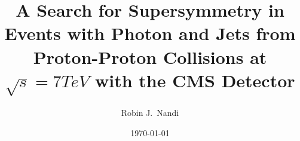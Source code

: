\documentclass[a4paper]{report}
\begin{document}
\title{A Search for Supersymmetry in Events with Photon and Jets from 
Proton-Proton Collisions at $\sqrt{s} = 7 \unit{TeV}$ with the CMS Detector}
\author{Robin J.\ Nandi}
\date{\today}

\maketitle

\tableofcontents



















%
\end{document}
